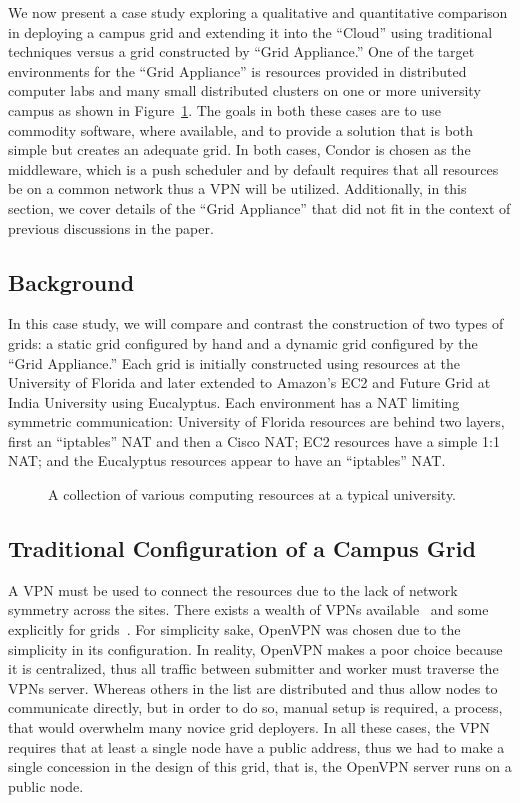 \documentclass[twocolumn]{svjour3}
\begin{document}
We now present a case study exploring a qualitative and quantitative comparison
in deploying a campus grid and extending it into the ``Cloud'' using
traditional techniques versus a grid constructed by ``Grid Appliance.''  One of
the target environments for the ``Grid Appliance'' is resources provided in
distributed computer labs and many small distributed clusters on one or more
university campus as shown in Figure~\ref{fig:unconnected}.  The goals in both
these cases are to use commodity software, where available, and to provide a
solution that is both simple but creates an adequate grid.  In both cases,
Condor is chosen as the middleware, which is a push scheduler and by default
requires that all resources be on a common network thus a VPN will be utilized.
Additionally, in this section, we cover details of the ``Grid Appliance'' that
did not fit in the context of previous discussions in the paper.

\subsection{Background}

In this case study, we will compare and contrast the construction of two types
of grids:  a static grid configured by hand and a dynamic grid configured by
the ``Grid Appliance.''  Each grid is initially constructed using resources at
the University of Florida and later extended to Amazon's EC2 and Future Grid at
India University using Eucalyptus.  Each environment has a NAT limiting
symmetric communication: University of Florida resources are behind two layers,
first an ``iptables'' NAT and then a Cisco NAT; EC2 resources have a simple 1:1
NAT; and the Eucalyptus resources appear to have an ``iptables'' NAT.

\begin{figure}[ht]
\centering
{}
\caption{A collection of various computing resources at a typical university.}
\label{fig:unconnected}
\end{figure}

\subsection{Traditional Configuration of a Campus Grid}

A VPN must be used to connect the resources due to the lack of network symmetry
across the sites.  There exists a wealth of VPNs
available~\cite{hamachi,openvpn,tinc} and some explicitly for
grids~\cite{violin,vine,vnet}.  For simplicity sake, OpenVPN was chosen due to
the simplicity in its configuration.  In reality, OpenVPN makes a poor choice
because it is centralized, thus all traffic between submitter and worker must
traverse the VPNs server.  Whereas others in the list are distributed and thus
allow nodes to communicate directly, but in order to do so, manual setup is
required, a process, that would overwhelm many novice grid deployers.  In all
these cases, the VPN requires that at least a single node have a public
address, thus we had to make a single concession in the design of this grid,
that is, the OpenVPN server runs on a public node.
\end{document}
